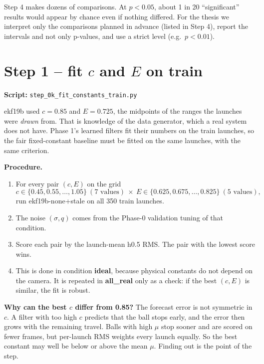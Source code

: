 \documentclass[11pt,a4paper]{article}
\begin{document}
\begin{warn}
Step 4 makes dozens of comparisons. At $p<0.05$, about 1 in 20 ``significant'' results would appear by chance even if
nothing differed. For the thesis we interpret only the comparisons planned in advance (listed in Step 4), report the
intervals and not only p-values, and use a strict level (e.g.\ $p<0.01$).
\end{warn}

\section{Step 1 -- fit $c$ and $E$ on train}
\noindent\textbf{Script:} \texttt{step\_0k\_fit\_constants\_train.py}\par\medskip
\begin{why}
ekf19b used $c=0.85$ and $E=0.725$, the midpoints of the ranges the launches were \emph{drawn} from. That is knowledge
of the data generator, which a real system does not have. Phase 1's learned filters fit their numbers on the train
launches, so the fair fixed-constant baseline must be fitted on the same launches, with the same criterion.
\end{why}
\textbf{Procedure.}
\begin{enumerate}
\item For every pair $(c,E)$ on the grid
  \[ c\in\{0.45,0.55,\dots,1.05\}\ (7\text{ values})\ \times\ E\in\{0.625,0.675,\dots,0.825\}\ (5\text{ values}), \]
  run ekf19b-none+stale on all 350 train launches.
\item The noise $(\sigma,q)$ comes from the Phase-0 validation tuning of that condition.
\item Score each pair by the launch-mean h0.5 RMS. The pair with the lowest score wins.
\item This is done in condition \textbf{ideal}, because physical constants do not depend on the camera. It is repeated in
  \textbf{all\_real} only as a check: if the best $(c,E)$ is similar, the fit is robust.
\end{enumerate}
\textbf{Why can the best $c$ differ from 0.85?} The forecast error is not symmetric in $c$. A filter with too high $c$
predicts that the ball stops early, and the error then grows with the remaining travel. Balls with high $\mu$ stop sooner
and are scored on fewer frames, but per-launch RMS weights every launch equally. So the best constant may well be below
or above the mean $\mu$. Finding out is the point of the step.
\end{document}

